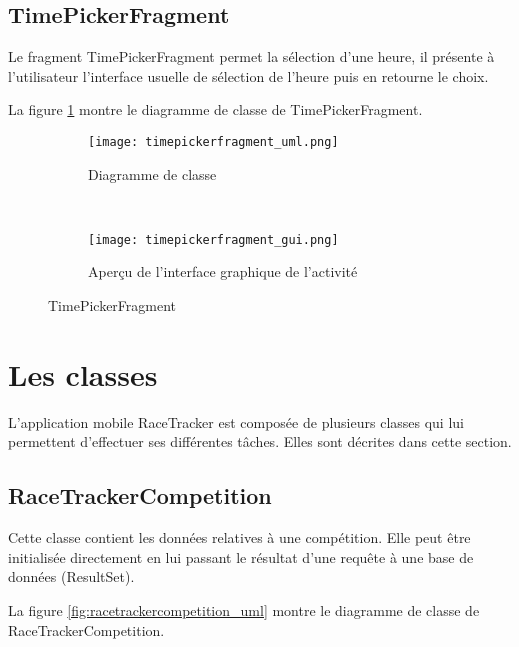 \subsection{TimePickerFragment}

Le fragment TimePickerFragment permet la sélection d'une heure, il présente à l'utilisateur l'interface usuelle de sélection de l'heure puis en retourne le choix.

La figure \ref{fig:timepickerfragment_uml} montre le diagramme de classe de TimePickerFragment.

\begin{figure}[htb!]
    \centering
    \begin{subfigure}[htb]{0.49\textwidth}
		\texttt{[image: timepickerfragment\_uml.png]} 
		\caption{Diagramme de classe}
		\label{fig:timepickerfragment_uml}
    \end{subfigure}
    ~ %
    \begin{subfigure}[htb]{0.49\textwidth}
		\texttt{[image: timepickerfragment\_gui.png]} 
		\caption{Aperçu de l'interface graphique de l'activité}
		\label{fig:timepickerfragment_gui}
    \end{subfigure}
    \caption{TimePickerFragment}\label{fig:timepickerfragment_fig}
\end{figure}

\section{Les classes}

L'application mobile RaceTracker est composée de plusieurs classes qui lui permettent d'effectuer ses différentes tâches. Elles sont décrites dans cette section.

\subsection{RaceTrackerCompetition}

Cette classe contient les données relatives à une compétition. Elle peut être initialisée directement en lui passant le résultat d'une requête à une base de données (ResultSet).

La figure \ref{fig:racetrackercompetition_uml} montre le diagramme de classe de RaceTrackerCompetition.

